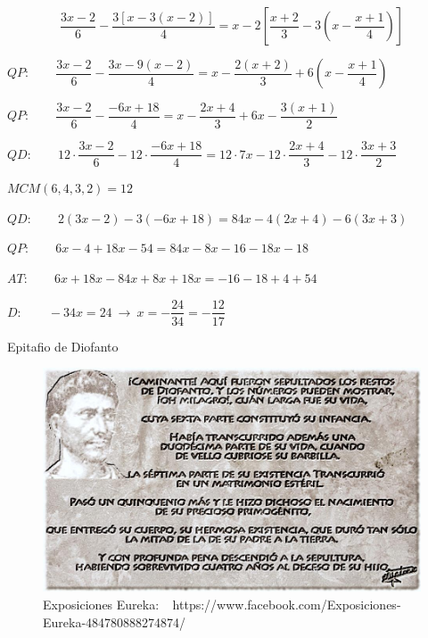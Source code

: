 \begin{miejemplo}

\begin{footnotesize}
$$\dfrac{3x-2}{6}-\dfrac{3[x-3(x-2)]}{4}=x-2\left[ \dfrac{x+2}{3}-3\left( x-\dfrac{x+1}{4} \right) \right]$$


\vspace{5mm} $ QP:\qquad \dfrac{3x-2}{6}-\dfrac{3x-9(x-2)}{4}=x-\dfrac{2(x+2)}{3}+6\left( x-\dfrac{x+1}{4} \right)$

\vspace{2mm} $QP:\qquad \dfrac{3x-2}{6}-\dfrac{-6x+18}{4}=x-\dfrac{2x+4}{3}+6 x-\dfrac{3(x+1)}{2} $

\vspace{2mm} $QD:\qquad 12\cdot \dfrac{3x-2}{6}-12\cdot \dfrac{-6x+18}{4}=12\cdot 7x-12\cdot \dfrac{2x+4}{3}-12\cdot \dfrac{3x+3}{2}\ \ $ \begin{tiny} ${MCM(6,4,3,2)=12}$\end{tiny}

\vspace{2mm} $QD:\qquad 2(3x-2)-3(-6x+18)=84x-4(2x+4)-6(3x+3)$

\vspace{2mm} $QP:\qquad 6x-4+18x-54=84x-8x-16-18x-18$

\vspace{2mm} $AT:\qquad 6x+18x-84x+8x+18x=-16-18+4+54$

\vspace{2mm} $D:\qquad -34x=24 \ \to \ x=-\dfrac{24}{34}=-\dfrac{12}{17}$
\end{footnotesize}	
\end{miejemplo}

\begin{myexampleblock}{Epitafio de Diofanto}

\begin{figure}[H]
	\centering
	\includegraphics[width=1\textwidth]{img-ecc/ecc09.jpeg}
	\caption*{\scriptsize{Exposiciones Eureka: $\ \ $ https://www.facebook.com/Exposiciones-Eureka-484780888274874/}}
\end{figure}
	
\end{myexampleblock}




